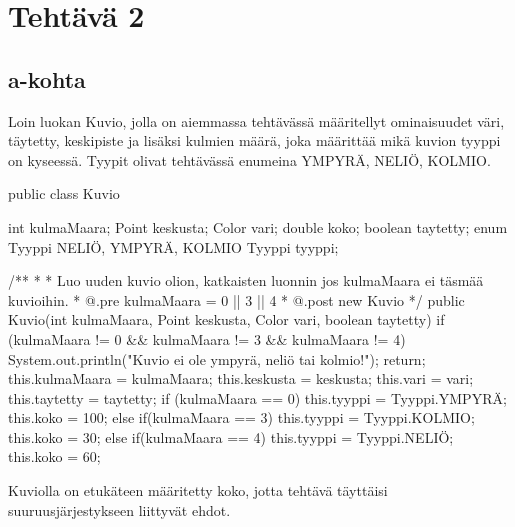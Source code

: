 
\chapter{Tehtävä 2 \label{chap:Teht=0000E4v=0000E4-2}}

\section{a-kohta}
\label{a-kohta}
Loin luokan Kuvio, jolla on aiemmassa tehtävässä määritellyt ominaisuudet väri, täytetty,
keskipiste ja lisäksi kulmien määrä, joka määrittää mikä kuvion tyyppi on kyseessä. Tyypit
olivat tehtävässä enumeina YMPYRÄ, NELIÖ, KOLMIO.
\begin{javacode}
public class Kuvio{
  int kulmaMaara;
  Point keskusta;
  Color vari;
  double koko;
  boolean taytetty;
  enum Tyyppi{
    NELIÖ, YMPYRÄ, KOLMIO
  }
  Tyyppi tyyppi;
  
  /**
   * 
   * Luo uuden kuvio olion, katkaisten luonnin jos kulmaMaara ei täsmää kuvioihin.
   * @.pre kulmaMaara = 0 || 3 || 4
   * @.post new Kuvio
   */
  public Kuvio(int kulmaMaara, Point keskusta, Color vari, boolean taytetty) {
    if (kulmaMaara != 0 && kulmaMaara != 3 && kulmaMaara != 4) {
      System.out.println("Kuvio ei ole ympyrä, neliö tai kolmio!");
      return;
    }
    this.kulmaMaara = kulmaMaara;
    this.keskusta = keskusta;
    this.vari = vari;
    this.taytetty = taytetty;
    if (kulmaMaara == 0) {
      this.tyyppi = Tyyppi.YMPYRÄ;
      this.koko = 100;
    }
    else if(kulmaMaara == 3){
      this.tyyppi = Tyyppi.KOLMIO;
      this.koko = 30;
    }
    else if(kulmaMaara == 4){
      this.tyyppi = Tyyppi.NELIÖ;
      this.koko = 60;
    }
  }
  
}

\end{javacode}
Kuviolla on etukäteen määritetty koko, jotta tehtävä täyttäisi suuruusjärjestykseen
liittyvät ehdot.

